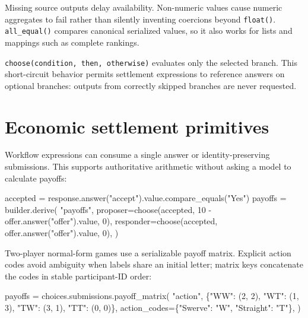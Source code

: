 \documentclass[
  10pt,
]{report}
\newenvironment{Shaded}{}{}
\newcommand{\DecValTok}[1]{\textcolor[rgb]{0.25,0.63,0.44}{#1}}
\newcommand{\NormalTok}[1]{#1}
\newcommand{\OperatorTok}[1]{\textcolor[rgb]{0.40,0.40,0.40}{#1}}
\newcommand{\StringTok}[1]{\textcolor[rgb]{0.25,0.44,0.63}{#1}}
\begin{document}
Missing source outputs delay availability. Non-numeric values cause
numeric aggregates to fail rather than silently inventing coercions
beyond \texttt{float()}. \texttt{all\_equal()} compares canonical
serialized values, so it also works for lists and mappings such as
complete rankings.

\texttt{choose(condition,\ then,\ otherwise)} evaluates only the
selected branch. This short-circuit behavior permits settlement
expressions to reference answers on optional branches: outputs from
correctly skipped branches are never requested.

\chapter{Economic settlement
primitives}\label{economic-settlement-primitives}

Workflow expressions can consume a single answer or identity-preserving
submissions. This supports authoritative arithmetic without asking a
model to calculate payoffs:

\begin{Shaded}
\begin{Highlighting}[]
\NormalTok{accepted }\OperatorTok{=}\NormalTok{ response.answer(}\StringTok{"accept"}\NormalTok{).value.compare\_equals(}\StringTok{"Yes"}\NormalTok{)}
\NormalTok{payoffs }\OperatorTok{=}\NormalTok{ builder.derive(}
    \StringTok{"payoffs"}\NormalTok{,}
\NormalTok{    proposer}\OperatorTok{=}\NormalTok{choose(accepted, }\DecValTok{10} \OperatorTok{{-}}\NormalTok{ offer.answer(}\StringTok{"offer"}\NormalTok{).value, }\DecValTok{0}\NormalTok{),}
\NormalTok{    responder}\OperatorTok{=}\NormalTok{choose(accepted, offer.answer(}\StringTok{"offer"}\NormalTok{).value, }\DecValTok{0}\NormalTok{),}
\NormalTok{)}
\end{Highlighting}
\end{Shaded}

Two-player normal-form games use a serializable payoff matrix. Explicit
action codes avoid ambiguity when labels share an initial letter; matrix
keys concatenate the codes in stable participant-ID order:

\begin{Shaded}
\begin{Highlighting}[]
\NormalTok{payoffs }\OperatorTok{=}\NormalTok{ choices.submissions.payoff\_matrix(}
    \StringTok{"action"}\NormalTok{,}
\NormalTok{    \{}\StringTok{"WW"}\NormalTok{: (}\DecValTok{2}\NormalTok{, }\DecValTok{2}\NormalTok{), }\StringTok{"WT"}\NormalTok{: (}\DecValTok{1}\NormalTok{, }\DecValTok{3}\NormalTok{), }\StringTok{"TW"}\NormalTok{: (}\DecValTok{3}\NormalTok{, }\DecValTok{1}\NormalTok{), }\StringTok{"TT"}\NormalTok{: (}\DecValTok{0}\NormalTok{, }\DecValTok{0}\NormalTok{)\},}
\NormalTok{    action\_codes}\OperatorTok{=}\NormalTok{\{}\StringTok{"Swerve"}\NormalTok{: }\StringTok{"W"}\NormalTok{, }\StringTok{"Straight"}\NormalTok{: }\StringTok{"T"}\NormalTok{\},}
\NormalTok{)}
\end{Highlighting}
\end{Shaded}
\end{document}
